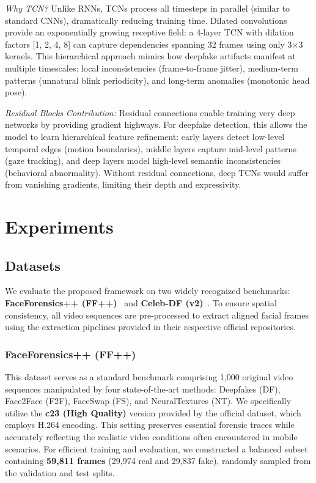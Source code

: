 \documentclass[conference]{IEEEtran}
\begin{document}
\textit{Why TCN?} Unlike RNNs, TCNs process all timesteps in parallel (similar to standard CNNs), dramatically reducing training time. Dilated convolutions provide an exponentially growing receptive field: a 4-layer TCN with dilation factors [1, 2, 4, 8] can capture dependencies spanning 32 frames using only 3×3 kernels. This hierarchical approach mimics how deepfake artifacts manifest at multiple timescales: local inconsistencies (frame-to-frame jitter), medium-term patterns (unnatural blink periodicity), and long-term anomalies (monotonic head pose).

\textit{Residual Blocks Contribution:} Residual connections enable training very deep networks by providing gradient highways. For deepfake detection, this allows the model to learn hierarchical feature refinement: early layers detect low-level temporal edges (motion boundaries), middle layers capture mid-level patterns (gaze tracking), and deep layers model high-level semantic inconsistencies (behavioral abnormality). Without residual connections, deep TCNs would suffer from vanishing gradients, limiting their depth and expressivity.


\section{Experiments}
\subsection{Datasets}
We evaluate the proposed framework on two widely recognized benchmarks: \textbf{FaceForensics++ (FF++)}~\cite{b8, b13} and \textbf{Celeb-DF (v2)}~\cite{b14}. To ensure spatial consistency, all video sequences are pre-processed to extract aligned facial frames using the extraction pipelines provided in their respective official repositories.

\subsubsection{FaceForensics++ (FF++)}
This dataset serves as a standard benchmark comprising 1,000 original video sequences manipulated by four state-of-the-art methods: Deepfakes (DF), Face2Face (F2F), FaceSwap (FS), and NeuralTextures (NT). We specifically utilize the \textbf{c23 (High Quality)} version provided by the official dataset, which employs H.264 encoding. This setting preserves essential forensic traces while accurately reflecting the realistic video conditions often encountered in mobile scenarios. For efficient training and evaluation, we constructed a balanced subset containing \textbf{59,811 frames} (29,974 real and 29,837 fake), randomly sampled from the validation and test splits.
\end{document}
